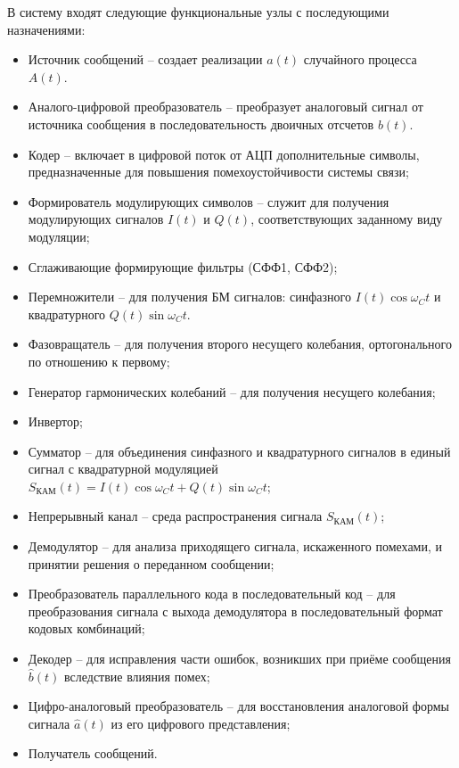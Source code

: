 \documentclass[a4paper, 12pt]{article}
\begin{document}
В систему входят следующие функциональные узлы с последующими назначениями:
\begin{itemize}
  \item Источник сообщений -- создает реализации $a(t)$ случайного
  процесса $A(t)$.
  \item Аналого-цифровой преобразователь -- преобразует аналоговый
  сигнал от источника сообщения в последовательность 
  двоичных отсчетов $b(t)$.
  \item Кодер -- включает в цифровой поток от АЦП дополнительные
  символы, предназначенные для повышения помехоустойчивости системы
  связи;
  \item Формирователь модулирующих символов -- служит для получения
  модулирующих сигналов $I(t)$ и $Q(t)$, соответствующих заданному
  виду модуляции;
  \item Сглаживающие формирующие фильтры (СФФ1, СФФ2);
  \item Перемножители -- для получения БМ сигналов: синфазного 
  $I(t)\cos{\omega_Ct}$ и квадратурного $Q(t)\sin{\omega_Ct}$.
  \item Фазовращатель -- для получения второго несущего колебания, 
  ортогонального по отношению к первому;
  \item Генератор гармонических колебаний -- для получения несущего  
  колебания;
  \item Инвертор;
  \item Сумматор -- для объединения синфазного и квадратурного 
  сигналов в единый сигнал с квадратурной модуляцией 
  $S_{КАМ}(t) = I(t)\cos{\omega_Ct} + Q(t)\sin{\omega_Ct}$;
  \item Непрерывный канал -- среда распространения сигнала 
  $S_{КАМ}(t)$;
  \item Демодулятор -- для анализа приходящего сигнала, 
  искаженного помехами, и принятии решения о переданном сообщении; 
  \item Преобразователь параллельного кода в последовательный код --
  для преобразования сигнала с выхода демодулятора в 
  последовательный формат кодовых комбинаций;
  \item Декодер -- для исправления части ошибок, возникших при приёме 
  сообщения $\hat{b}(t)$ вследствие влияния помех; 
  \item Цифро-аналоговый преобразователь -- для восстановления  
  аналоговой формы сигнала $\hat{a}(t)$ из его цифрового представления;
  \item Получатель сообщений.
\end{itemize}
\end{document}
